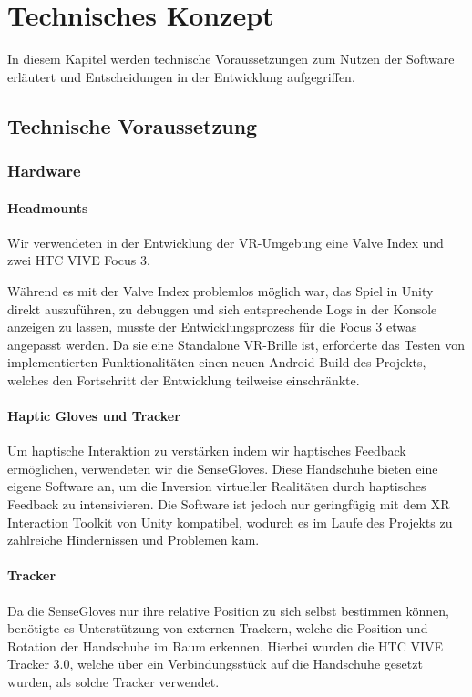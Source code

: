 \chapter{Technisches Konzept}
In diesem Kapitel werden technische Voraussetzungen zum Nutzen der Software erläutert und Entscheidungen in der Entwicklung aufgegriffen.

\section{Technische Voraussetzung}

\subsection{Hardware}
\subsubsection{Headmounts}
Wir verwendeten in der Entwicklung der VR-Umgebung eine Valve Index und zwei HTC VIVE Focus 3.

Während es mit der Valve Index problemlos möglich war, das Spiel in Unity direkt auszuführen, zu debuggen und sich entsprechende Logs in der Konsole anzeigen zu lassen, musste der Entwicklungsprozess für die Focus 3 etwas angepasst werden. Da sie eine Standalone VR-Brille ist, erforderte das Testen von implementierten Funktionalitäten einen neuen Android-Build des Projekts, welches den Fortschritt der Entwicklung teilweise einschränkte.

\subsubsection{Haptic Gloves und Tracker}
Um haptische Interaktion zu verstärken indem wir haptisches Feedback ermöglichen, verwendeten wir die \dq SenseGloves\dq. Diese Handschuhe bieten eine eigene Software an, um die Inversion virtueller Realitäten durch haptisches Feedback zu intensivieren. Die Software ist jedoch nur geringfügig mit dem XR Interaction Toolkit von Unity kompatibel, wodurch es im Laufe des Projekts zu zahlreiche Hindernissen und Problemen kam.  
\subsubsection{Tracker}
\noindent Da die SenseGloves nur ihre relative Position zu sich selbst bestimmen können, benötigte es Unterstützung von externen Trackern, welche die Position und Rotation der Handschuhe im Raum erkennen. Hierbei wurden die \dq HTC VIVE Tracker 3.0\dq, welche über ein Verbindungsstück auf die Handschuhe gesetzt wurden, als solche Tracker verwendet.

